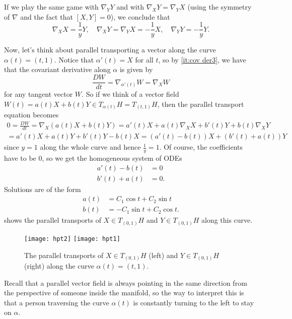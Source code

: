 \begin{example}
	If we play the same game with $\nabla_YY$ and with $\nabla_XY = \nabla_YX$ (using the symmetry of $\nabla$ and the fact that $[X,Y] = 0$), we conclude that
	\[
		\nabla_XX = \frac{1}{y}Y , \quad \nabla_XY = \nabla_YX = -\frac{1}{y}X, \quad \nabla_YY = -\frac{1}{y}Y.
	\]
	
	Now, let's think about parallel transporting a vector along the curve $\alpha(t) = (t,1)$. Notice that $\alpha'(t) = X$ for all $t$, so by \ref{it:cov der3}, we have that the covariant derivative along $\alpha$ is given by
	\[
		\frac{DW}{dt} = \nabla_{\alpha'(t)} W = \nabla_X W
	\]
	for any tangent vector $W$. So if we think of a vector field $W(t) = a(t)X + b(t)Y \in T_{\alpha(t)}H = T_{(t,1)}H$, then the parallel transport equation becomes
	\begin{multline*}
		0 = \frac{DW}{dt} = \nabla_X (a(t)X + b(t)Y) = a'(t) X + a(t) \nabla_X X + b'(t)Y + b(t) \nabla_X Y \\
		= a'(t) X +a(t)Y + b'(t) Y - b(t)X = (a'(t)-b(t))X + (b'(t)+a(t))Y
	\end{multline*}
	since $y=1$ along the whole curve and hence $\frac{1}{y} = 1$. Of course, the coefficients have to be 0, so we get the homogeneous system of ODEs
	\begin{align*}
		a'(t)-b(t) & = 0 \\
		b'(t)+a(t) & = 0.
	\end{align*}
	Solutions are of the form
	\begin{align*}
		a(t) & = C_1 \cos t + C_2 \sin t \\
		b(t) & = -C_1 \sin t + C_2 \cos t.
	\end{align*}
	 shows the parallel transports of $X \in T_{(0,1)}H$ and $Y \in T_{(0,1)}H$ along this curve.
	\begin{figure}[htbp]
		\centering
			\texttt{[image: hpt2]}
			\qquad 
			\texttt{[image: hpt1]}
		\caption{The parallel transports of $X \in T_{(0,1)}H$ (left) and $Y \in T_{(0,1)}H$ (right) along the curve $\alpha(t) = (t,1)$.}
		\label{fig:hpt}
	\end{figure}
	
	Recall that a parallel vector field is always pointing in the same direction from the perspective of someone inside the manifold, so the way to interpret this is that a person traversing the curve $\alpha(t)$ is constantly turning to the left to stay on $\alpha$.
	

\end{example}
